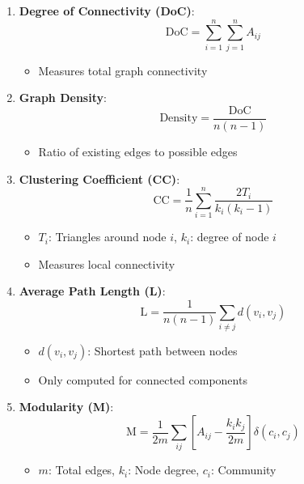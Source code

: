 \documentclass[12pt]{ieeetj}
\begin{document}
\begin{enumerate}
    \item \textbf{Degree of Connectivity (DoC)}:
    \begin{equation}
        \text{DoC} = \sum_{i=1}^n \sum_{j=1}^n A_{ij}
    \end{equation}
    \begin{itemize}
        \item Measures total graph connectivity
    \end{itemize}

    \item \textbf{Graph Density}:
    \begin{equation}
        \text{Density} = \frac{\text{DoC}}{n(n-1)}
    \end{equation}
    \begin{itemize}
        \item Ratio of existing edges to possible edges
    \end{itemize}

    \item \textbf{Clustering Coefficient (CC)}:
    \begin{equation}
        \text{CC} = \frac{1}{n}\sum_{i=1}^n \frac{2T_i}{k_i(k_i-1)}
    \end{equation}
    \begin{itemize}
        \item $T_i$: Triangles around node $i$, $k_i$: degree of node $i$
        \item Measures local connectivity
    \end{itemize}

    \item \textbf{Average Path Length (L)}:
    \begin{equation}
        \text{L} = \frac{1}{n(n-1)}\sum_{i\neq j}d(v_i,v_j)
    \end{equation}
    \begin{itemize}
        \item $d(v_i,v_j)$: Shortest path between nodes
        \item Only computed for connected components
    \end{itemize}

    \item \textbf{Modularity (M)}:
    \begin{equation}
        \text{M} = \frac{1}{2m}\sum_{ij}\left[A_{ij} - \frac{k_ik_j}{2m}\right]\delta(c_i,c_j)
    \end{equation}
    \begin{itemize}
        \item $m$: Total edges, $k_i$: Node degree, $c_i$: Community
    \end{itemize}


\end{enumerate}
\end{document}
